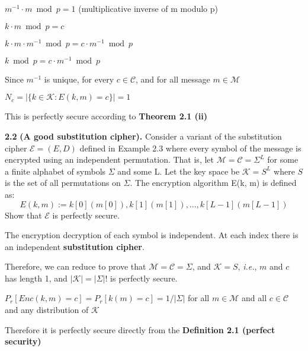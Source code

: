 \begin{tcolorbox}[solutionbox, title=Answer: Perfectly Secure]
    $m^{-1} \cdot m \bmod p = 1$ (multiplicative inverse of m modulo p)
    \vspace{1em}

    $k \cdot m \bmod p = c$

    $k \cdot m \cdot m^{-1} \bmod p = c \cdot m^{-1} \bmod p$

    $k \bmod p = c \cdot m^{-1} \bmod p$

    Since $m^{-1}$ is unique, for every $c \in \mathcal{C}$, and for all message $m \in \mathcal{M}$

    $N_c = |\{k \in \mathcal{K}: E(k,m) = c\}| = 1$

    This is perfectly secure according to \textbf{Theorem 2.1 (ii)}
\end{tcolorbox}

\newpage
\noindent
\textbf{2.2}
\textbf{(A good substitution cipher).} Consider a variant of the substitution cipher $\mathcal{E} = (E, D)$
defined in Example 2.3 where every symbol of the message is encrypted using an independent
permutation. That is, let $\mathcal{M} = \mathcal{C} = \Sigma^L$  for some a finite alphabet of symbols $\Sigma$ and some L. Let
the key space be $\mathcal{K} = S^L$ where $S$ is the set of all permutations on $\Sigma$. The encryption algorithm
E(k, m) is defined as:
\[
E(k, m) := k[0](m[0]), k[1](m[1]), . . . , k[L-1](m[L-1])
\]
Show that $\mathcal{E}$ is perfectly secure.


\begin{tcolorbox}[solutionbox, title=Answer]
    The encryption decryption of each symbol is independent. At each index there is an independent \textbf{substitution cipher}.
    \vspace{1em}

    Therefore, we can reduce to prove that $\mathcal{M} = \mathcal{C} = \Sigma$, and $\mathcal{K} = S$, \textit{i.e.}, $m$ and $c$ has length 1, and $|\mathcal{K}| = |\Sigma|!$ is perfectly secure.
    \vspace{1em}

    $P_r[Enc(k, m) = c] = P_r[k(m) = c] = 1/|\Sigma|$ for all $m \in \mathcal{M}$ and all $c \in \mathcal{C}$ and any distribution of $\mathcal{K}$
    \vspace{1em}

    Therefore it is perfectly secure directly from the \textbf{Definition 2.1 (perfect security)} 

\end{tcolorbox}



